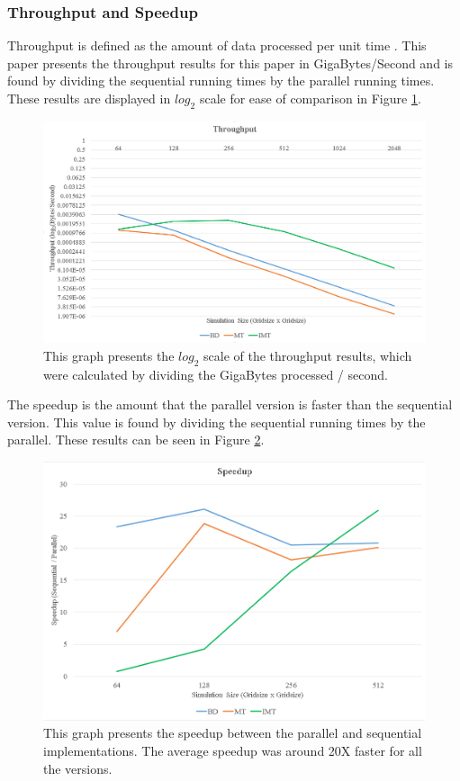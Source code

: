 \subsubsection{Throughput and Speedup}
Throughput is defined as the amount of data processed per unit time \cite{cuda}. This paper presents the throughput results for this paper in GigaBytes/Second and is found by dividing the sequential running times by the parallel running times. These results are displayed in $log_2$ scale for ease of comparison in Figure \ref{fig:throughput}.
\begin{figure}[!b]
\centering
  \includegraphics[width=\textwidth]{figures/results/throughput.png}
  \caption{This graph presents the $log_2$ scale of the throughput results, which were calculated by dividing the GigaBytes processed / second.}
  \label{fig:throughput}
\end{figure} 

The speedup is the amount that the parallel version is faster than the sequential version. This value is found by dividing the sequential running times by the parallel. These results can be seen in Figure \ref{fig:speedup}. 
\begin{figure}[!b]
\centering
  \includegraphics[width=\textwidth]{figures/results/speedup.png}
  \caption{This graph presents the speedup between the parallel and sequential implementations. The average speedup was around 20X faster for all the versions.}
  \label{fig:speedup}
\end{figure} 

